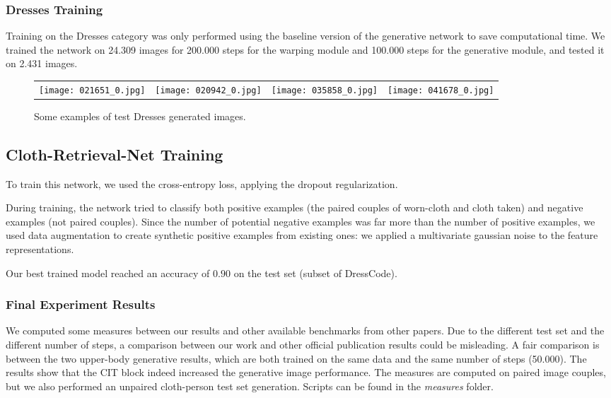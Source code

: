 \subsubsection{Dresses Training}

Training on the Dresses category was only performed using the baseline version of the generative network to save computational time. We trained the network on 24.309 images for 200.000 steps for the warping module and 100.000 steps for the generative module, and tested it on 2.431 images.

\FloatBarrier
\begin{figure}[h]
\centering
\begin{tabular}{cccc}
{\texttt{[image: 021651\_0.jpg]}} &
{\texttt{[image: 020942\_0.jpg]}} &
{\texttt{[image: 035858\_0.jpg]}} &
{\texttt{[image: 041678\_0.jpg]}} \\
\end{tabular}

\caption{Some examples of test Dresses generated images.}
\end{figure}
\FloatBarrier

\subsection{Cloth-Retrieval-Net Training}
To train this network, we used the cross-entropy loss, applying the dropout regularization.

During training, the network tried to classify both positive examples (the paired couples of worn-cloth and cloth taken) and negative examples (not paired couples). Since the number of potential negative examples was far more than the number of positive examples, we used data augmentation to create synthetic positive examples from existing ones: we applied a multivariate gaussian noise to the feature representations.

Our best trained model reached an accuracy of $0.90$ on the test set (subset of DressCode).  


\subsubsection{Final Experiment Results}
We computed some measures between our results and other available benchmarks from other papers. Due to the different test set and the different number of steps, a comparison between our work and other official publication results could be misleading. A fair comparison is between the two upper-body generative results, which are both trained on the same data and the same number of steps (50.000). The results show that the CIT block indeed increased the generative image performance. The measures are computed on paired image couples, but we also performed an unpaired cloth-person test set generation. Scripts can be found in the \textit{measures} folder.


